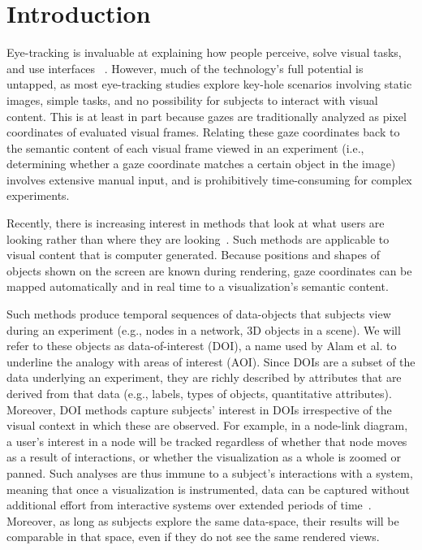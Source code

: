 \section{Introduction}
Eye-tracking is invaluable at explaining how people perceive, solve visual tasks, and use interfaces ~\cite{duchowski2002breadth}. However, much of the technology's full potential is untapped, as most eye-tracking studies explore key-hole scenarios involving static images, simple tasks, and no possibility for subjects to interact with visual content. This is at least in part because gazes are traditionally analyzed as pixel coordinates of evaluated visual frames. Relating these gaze coordinates back to the semantic content of each visual frame viewed in an experiment (i.e., determining whether a gaze coordinate matches a certain object in the image) involves extensive manual input, and is prohibitively time-consuming for complex experiments.
 
Recently, there is increasing interest in methods that look at what users are looking rather than where they are looking~\cite{alam15analyzing, sundstedt2013visual, bernhard2014gaze}. Such methods are applicable to visual content that is computer generated. Because positions and shapes of objects shown on the screen are known during rendering, gaze coordinates can be mapped automatically and in real time to a visualization's semantic content.  

Such methods produce temporal sequences of data-objects that subjects view during an experiment (e.g., nodes in a network, 3D objects in a scene). We will refer to these objects as data-of-interest (DOI), a name used by Alam et al. to underline the analogy with areas of interest (AOI). Since DOIs are a subset of the data underlying an experiment, they are richly described by attributes that are derived from that data (e.g., labels, types of objects, quantitative attributes). Moreover, DOI methods capture subjects' interest in DOIs irrespective of the visual context in which these are observed. For example, in a node-link diagram, a user's interest in a node will be tracked regardless of whether that node moves as a result of interactions, or whether the visualization as a whole is zoomed or panned. Such analyses are thus immune to a subject's interactions with a system, meaning that once a visualization is instrumented, data can be captured without additional effort from interactive systems over extended periods of time~\cite{alam15analyzing}. Moreover, as long as subjects explore the same data-space, their results will be comparable in that space, even if they do not see the same rendered views. 


